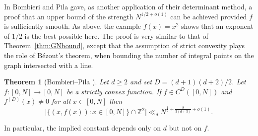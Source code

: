 \documentclass[12pt]{amsart}
\newcommand{\1}{{\mathbf 1}}
\newtheorem{theorem}{Theorem}
\theoremstyle{remark}
\theoremstyle{definition}
\begin{document}
In \cite{BP89} Bombieri and Pila gave, as another application of their determinant method, a proof that an upper bound of the strength $N^{1/2+o(1)}$ can be achieved provided $f$ is sufficiently smooth. As above, the example $f(x)=x^2$ shows that an exponent of $1/2$ is the best possible here. The proof is very similar to that of Theorem~\ref{thm:GNbound}, except that the assumption of strict convexity plays the role of B\'ezout's theorem, when bounding the number of integral points on the graph intersected with a line.
\begin{theorem}[Bombieri--Pila \cite{BP89}]
Let $d\geq 2$ and set $D=(d+1)(d+2)/2$. Let $f:[0,N]\to [0,N]$ be a strictly convex function. If $f\in C^D([0,N])$ and $f^{(D)}(x)\neq 0$ for all $x\in [0,N]$ then
\[ \lvert \{ (x,f(x)) : x \in [0,N]\}\cap \mathbb{Z}^2 \rvert \ll_d N^{\frac{1}{2}+\frac{8}{3(d+3)}+o(1)}.\]
\end{theorem}
In particular, the implied constant depends only on $d$ but not on $f$.
\end{document}
